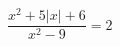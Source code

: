 \begin{ex}[type=equation]
	\begin{condition}
		$\dfrac{x^2 + 5\big|x\big| + 6}{x^2 - 9} = 2$
	\end{condition}
\end{ex}